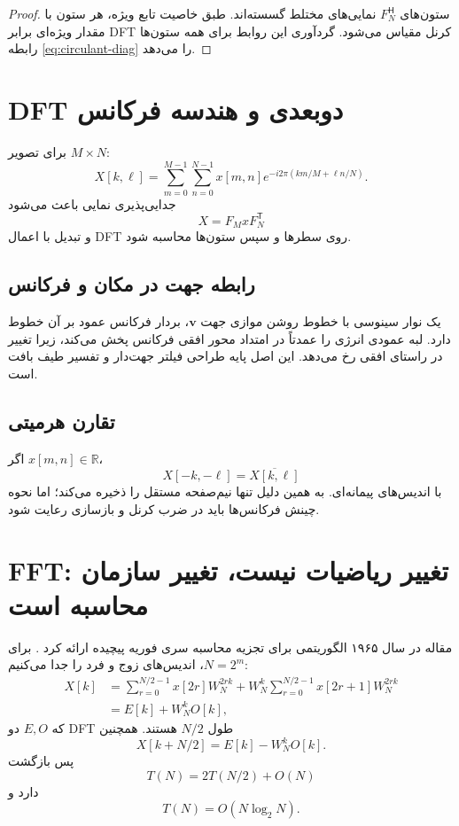 \documentclass[12pt,openany,oneside]{book}
\newcommand{\R}{\mathbb{R}}
\newcommand{\herm}{^{\mathsf H}}
\newcommand{\vect}[1]{\bm{#1}}
\begin{document}
\begin{proof}
ستون‌های \(F_N\herm\) نمایی‌های مختلط گسسته‌اند. طبق خاصیت تابع ویژه، هر ستون با مقدار ویژه‌ای برابر
DFT کرنل مقیاس می‌شود. گردآوری این روابط برای همه ستون‌ها رابطه \eqref{eq:circulant-diag} را می‌دهد.
\end{proof}

\section{DFT دوبعدی و هندسه فرکانس}

برای تصویر \(M\times N\):
\begin{equation}
X[k,\ell]=\sum_{m=0}^{M-1}\sum_{n=0}^{N-1}
 x[m,n]e^{-i2\pi(km/M+\ell n/N)}.
\end{equation}
جدایی‌پذیری نمایی باعث می‌شود
\begin{equation}
X=F_M x F_N^{\mathsf T}
\end{equation}
و تبدیل با اعمال DFT روی سطرها و سپس ستون‌ها محاسبه شود.

\subsection{رابطه جهت در مکان و فرکانس}
یک نوار سینوسی با خطوط روشن موازی جهت \(\vect v\)، بردار فرکانس عمود بر آن خطوط دارد. لبه عمودی
انرژی را عمدتاً در امتداد محور افقی فرکانس پخش می‌کند، زیرا تغییر در راستای افقی رخ می‌دهد. این اصل پایه
طراحی فیلتر جهت‌دار و تفسیر طیف بافت است.

\subsection{تقارن هرمیتی}
اگر \(x[m,n]\in\R\)،
\begin{equation}
X[-k,-\ell]=\overline{X[k,\ell]}
\end{equation}
با اندیس‌های پیمانه‌ای. به همین دلیل  تنها نیم‌صفحه مستقل را ذخیره می‌کند؛ اما نحوه چینش
فرکانس‌ها باید در ضرب کرنل و بازسازی رعایت شود.

\section{FFT: تغییر ریاضیات نیست، تغییر سازمان محاسبه است}

مقاله  در سال ۱۹۶۵ الگوریتمی برای تجزیه محاسبه سری فوریه پیچیده ارائه کرد
\cite{cooley1965fft}. برای \(N=2^m\)، اندیس‌های زوج و فرد را جدا می‌کنیم:
\begin{align}
X[k]
&=\sum_{r=0}^{N/2-1}x[2r]W_N^{2rk}
+W_N^k\sum_{r=0}^{N/2-1}x[2r+1]W_N^{2rk}\\
&=E[k]+W_N^kO[k],
\end{align}
که \(E,O\) دو DFT طول \(N/2\) هستند. همچنین
\begin{equation}
X[k+N/2]=E[k]-W_N^kO[k].
\end{equation}
پس بازگشت
\begin{equation}
T(N)=2T(N/2)+O(N)
\end{equation}
دارد و
\begin{equation}
T(N)=O(N\log_2N).
\end{equation}
\end{document}
